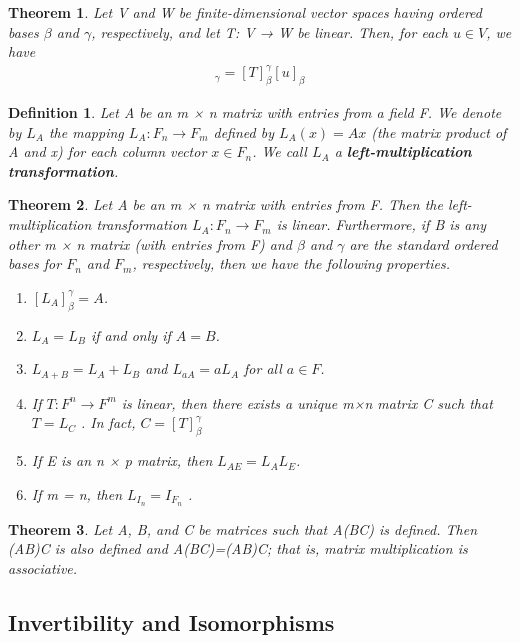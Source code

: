 \documentclass{article}
\newcommand{\bd}[1]{\textbf{#1}}
\theoremstyle{plain}
\newtheorem{theorem}{Theorem}[section]
\newtheorem*{definition1}{Definition}
\theoremstyle{plain} %
\begin{document}
\begin{theorem}
Let V and W be finite-dimensional vector spaces having ordered bases $\beta$ and $\gamma$, respectively, and let T: V → W be linear. Then, for each $u \in V$, we have
\begin{align*}
[T(u)]_\gamma=[T]_\beta^\gamma[u]_\beta
\end{align*}
\end{theorem}

\begin{definition1}
Let A be an m × n matrix with entries from a field F. We denote by $L_A$ the mapping $L_A : F_n \to F_m$ defined by $L_A(x) = Ax$ (the matrix product of A and x) for each column vector $x \in F_n$. We call $L_A$ a \bd{left-multiplication transformation}.
\end{definition1}

\begin{theorem}
Let A be an m × n matrix with entries from F. Then the left-multiplication transformation $L_A : F_n \to F_m$ is linear. Furthermore, if B is any other m × n matrix (with entries from F) and $\beta$ and $\gamma$ are the standard ordered bases for $F_n$ and $F_m$, respectively, then we have the following properties.
\begin{enumerate}[label=(\alph*)]
\item $[L_A]_\beta^\gamma = A$.
\item $L_A = L_B$ if and only if $A = B$.
\item $L_{A+B} = L_A + L_B$ and $L_{aA} = aL_A$ for all $a \in F$.
\item If $T: F^n \to F^m$ is linear, then there exists a unique m×n matrix C such that $T = L_C$ . In fact, $C = [T]_\beta^\gamma$
\item If E is an n × p matrix, then $L_{AE} = L_AL_E$.
\item If m = n, then $L_{I_n} = I_{F_n}$ .
\end{enumerate}
\end{theorem}

\begin{theorem}
Let A, B, and C be matrices such that A(BC) is defined. Then (AB)C is also defined and A(BC)=(AB)C; that is, matrix multiplication is associative.
\end{theorem}

\subsection{Invertibility and Isomorphisms}
\end{document}
